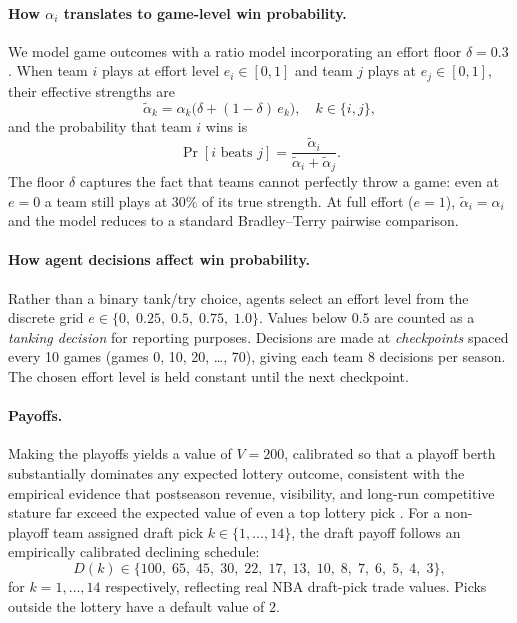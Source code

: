 \documentclass{article}
\begin{document}
\paragraph{How $\alpha_i$ translates to game-level win probability.}
We model game outcomes with a ratio model incorporating an effort floor
$\delta = 0.3$.
When team $i$ plays at effort level $e_i \in [0,1]$ and team $j$ plays at
$e_j \in [0,1]$, their effective strengths are
\[
    \tilde{\alpha}_k = \alpha_k \bigl(\delta + (1 - \delta)\, e_k\bigr),
    \quad k \in \{i, j\},
\]
and the probability that team $i$ wins is
\[
    \Pr[\text{$i$ beats $j$}]
    = \frac{\tilde{\alpha}_i}{\tilde{\alpha}_i + \tilde{\alpha}_j}.
\]
The floor $\delta$ captures the fact that teams cannot perfectly throw a game:
even at $e = 0$ a team still plays at $30\%$ of its true strength.
At full effort ($e = 1$), $\tilde{\alpha}_i = \alpha_i$ and the model reduces
to a standard Bradley--Terry pairwise comparison.

\paragraph{How agent decisions affect win probability.}
Rather than a binary tank/try choice, agents select an effort level from the
discrete grid $e \in \{0,\; 0.25,\; 0.5,\; 0.75,\; 1.0\}$.
Values below $0.5$ are counted as a \emph{tanking decision} for reporting
purposes.
Decisions are made at \emph{checkpoints} spaced every 10 games
(games 0, 10, 20, \ldots, 70), giving each team 8 decisions per season.
The chosen effort level is held constant until the next checkpoint.

\paragraph{Payoffs.}
Making the playoffs yields a value of $V = 200$, calibrated so that a playoff
berth substantially dominates any expected lottery outcome, consistent with
the empirical evidence that postseason revenue, visibility, and long-run
competitive stature far exceed the expected value of even a top lottery pick
\citep{taylor2002}.
For a non-playoff team assigned draft pick $k \in \{1, \ldots, 14\}$, the
draft payoff follows an empirically calibrated declining schedule:
\[
    D(k) \in \{100,\; 65,\; 45,\; 30,\; 22,\; 17,\; 13,\; 10,\;
               8,\; 7,\; 6,\; 5,\; 4,\; 3\},
\]
for $k = 1, \ldots, 14$ respectively, reflecting real NBA draft-pick trade
values. Picks outside the lottery have a default value of $2$.
\end{document}
